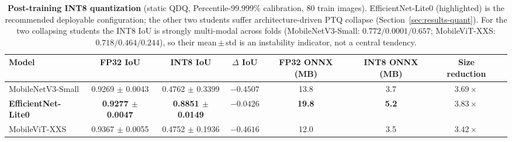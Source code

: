 \begin{table}[ht]
\centering
\caption{\textbf{Post-training INT8 quantization} (static QDQ, Percentile-99.999\% calibration, 80 train images). EfficientNet-Lite0 (highlighted) is the recommended deployable configuration; the other two students suffer architecture-driven PTQ collapse (Section~\ref{sec:results-quant}). For the two collapsing students the INT8 IoU is strongly multi-modal across folds (MobileNetV3-Small: $0.772 / 0.0001 / 0.657$; MobileViT-XXS: $0.718 / 0.464 / 0.244$), so their mean\,$\pm$\,std is an instability indicator, not a central tendency.}
\label{tab:t4-quant}
\small
\setlength{\tabcolsep}{5pt}
\begin{tabular}{lccccccc}
\toprule
\textbf{Model} & \textbf{FP32 IoU} & \textbf{INT8 IoU} & \textbf{$\Delta$ IoU} & \textbf{FP32 ONNX (MB)} & \textbf{INT8 ONNX (MB)} & \textbf{Size reduction} \\
\midrule
MobileNetV3-Small   & 0.9269 $\pm$ 0.0043 & 0.4762 $\pm$ 0.3399 & $-0.4507$ & 13.8 & 3.7 & $3.69\times$ \\
\textbf{EfficientNet-Lite0} & \textbf{0.9277 $\pm$ 0.0047} & \textbf{0.8851 $\pm$ 0.0149} & $\boldsymbol{-0.0426}$ & \textbf{19.8} & \textbf{5.2} & $\boldsymbol{3.83\times}$ \\
MobileViT-XXS       & 0.9367 $\pm$ 0.0055 & 0.4752 $\pm$ 0.1936 & $-0.4616$ & 12.0 & 3.5 & $3.42\times$ \\
\bottomrule
\end{tabular}
\end{table}
